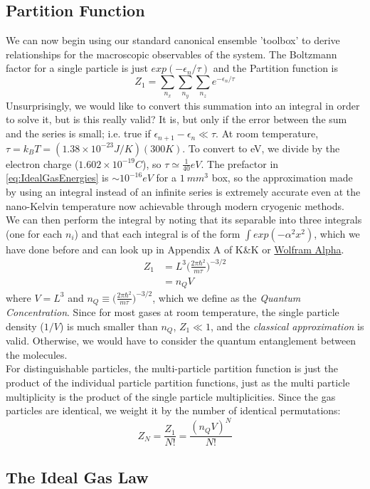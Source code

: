 \subsection{Partition Function}
We can now begin using our standard canonical ensemble 'toolbox' to derive relationships for the macroscopic observables of the system. The Boltzmann factor for a single particle is just $exp(-\epsilon_n/\tau)$ and the Partition function is
\begin{equation}
Z_1 = \sum_{n_x} \sum_{n_y} \sum_{n_z} e^{-\epsilon_n/\tau}
\end{equation}
Unsurprisingly, we would like to convert this summation into an integral in order to solve it, but is this really valid? It is, but only if the error between the sum and the series is small; i.e. true if $\epsilon_{n+1} - \epsilon_n \ll \tau$. 
At room temperature, $\tau = k_B T = (1.38 \times 10^{-23} J/K)(300 K)$. 
To convert to eV, we divide by the electron charge ($1.602 \times 10^{-19} C$), 
so $\tau \simeq \frac{1}{40} eV$. The
prefactor in \cref{eq:IdealGasEnergies} is $\sim 10^{-16} eV$ for a $1~mm^3$ box,
so the approximation made by using an integral instead of an infinite series is extremely accurate even at the nano-Kelvin temperature now achievable through modern cryogenic methods.\\

We can then perform the integral by noting that its separable into three integrals (one for each $n_i$) and that each integral is of the form $\int exp(-\alpha^2 x^2)$, which we have done before and can look up in Appendix A of K\&K or 
\href{http://www.wolframalpha.com/input/?i=integrate\%20exp(-a\%5E2\%20x\%5E2)\%20from\%20x\%3D0..infinity}{Wolfram Alpha}.
\begin{align}
Z_1 &= L^3 \bigg(\frac{2 \pi \hbar^2}{m \tau}\bigg)^{-3/2} \\
    &= n_Q V
\end{align}
where $V = L^3$ and $n_Q \equiv \bigg(\frac{2 \pi \hbar^2}{m \tau}\bigg)^{-3/2}$, which we define as the \emph{Quantum Concentration}. Since for most gases at
room temperature, the single particle density ($1/V$) is much smaller than
$n_Q$, $Z_1 \ll 1$, and the \textit{classical approximation} is valid. Otherwise, we would have to consider the quantum entanglement between the molecules.\\

For distinguishable particles, the multi-particle partition function is just the product of the individual particle partition functions, just as the multi particle multiplicity is the product of the single particle multiplicities. Since the
gas particles are identical, we weight it by the number of identical permutations:
\begin{equation}
Z_N = \frac{Z_1}{N!} = \frac{(n_Q V)^N}{N!}
\end{equation}

\subsection{The Ideal Gas Law}





